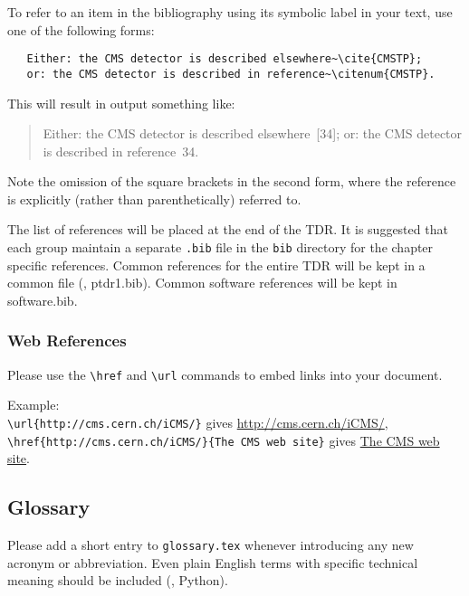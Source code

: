 To refer to an item in the bibliography using its symbolic label
in your text, use one of the following forms:
\vspace*{-2.5ex}\begin{verbatim}
   Either: the CMS detector is described elsewhere~\cite{CMSTP};
   or: the CMS detector is described in reference~\citenum{CMSTP}.
\end{verbatim}

This will result in output something like:
\begin{quote}
   Either: the CMS detector is described elsewhere~[34];
   or: the CMS detector is described in reference~34.
\end{quote}
%
Note the omission of the square brackets in the second form,
where the reference is explicitly (rather than parenthetically)
referred to.

The list of references will be placed at the end of the TDR. It is
suggested that each group maintain a separate \texttt{.bib} file in the
\texttt{bib} directory for the chapter specific references. Common
references for the entire TDR will be kept in a common file (\eg, ptdr1.bib). Common software references will be kept in
software.bib.

\subsubsection{Web References}
Please use the \verb+\href+ and \verb+\url+ commands to embed links into your document.

Example:\\
\verb+\url{http://cms.cern.ch/iCMS/}+ gives \url{http://cms.cern.ch/iCMS/},\\
\verb+\href{http://cms.cern.ch/iCMS/}{The CMS web site}+ gives \href{http://cms.cern.ch/iCMS/}{The CMS web site}.


\subsection{Glossary}

Please add a short entry to \texttt{glossary.tex}
whenever introducing any new acronym or abbreviation.
Even plain English terms with specific technical
meaning should be included (\eg, Python).
\setlength{\columnseprule}{0.2mm}
\setlength{\multicolsep}{7mm}
\providecommand{\symexamp}[2]
{
\makebox[0.160\textwidth][l]{#1:}
                          \makebox[0.025\textwidth][l]{~}
                          \parbox[t]{0.32\textwidth}{#2\vspace*{-2.5mm}\\}}

